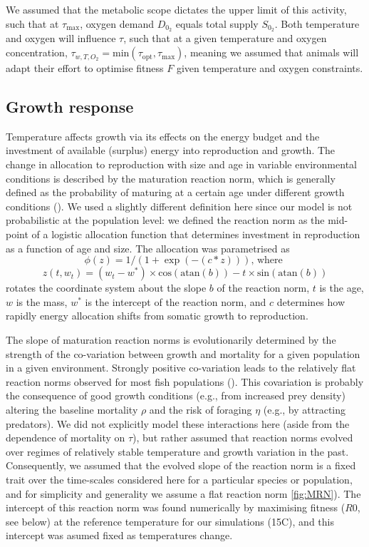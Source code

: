 \documentclass[a4paper, toc=index,abstract=true]{scrartcl}\usepackage[]{graphicx}\usepackage[]{color}
\begin{document}
\begin{spacing}{1.9}
We assumed that the metabolic scope dictates the upper limit of this activity, such that at $\tau_{\text{max}}$, oxygen demand $D_{0_2}$ equals total supply $S_{0_2}$. Both temperature and oxygen will influence $\tau$, such that at a given temperature and oxygen concentration, $\tau_{w,T,O_2} = \text{min}\left( \tau_{\text{opt}},\tau_{\text{max}} \right)$, meaning we assumed that animals will adapt their effort to optimise fitness $F$ given temperature and oxygen constraints.


\subsection{Growth response}

Temperature affects growth via its effects on the energy budget and the investment of available (surplus) energy into reproduction and growth. The change in allocation to reproduction with size and age in variable environmental conditions is described by the maturation reaction norm, which is generally defined as the probability of maturing at a certain age under different growth conditions (\cite[e.g., ][]{dieckmann_probabilistic_2007}). We used a slightly different definition here since our model is not probabilistic at the population level: we defined the reaction norm as the mid-point of a logistic allocation function that determines investment in reproduction as a function of age and size. The allocation was parametrised as 
$$\phi(z) = 1/(1+\exp(-(c*z))) \text{, where }$$
$$z(t, w_t) = (w_t-w^*)\times \text{cos}(\text{atan}(b))-t\times \text{sin}(\text{atan}(b))$$ 
rotates the coordinate system about the slope $b$ of the reaction norm, $t$ is the age, $w$ is the mass, $w^*$ is the intercept of the reaction norm, and $c$ determines how rapidly energy allocation shifts from somatic growth to reproduction.

The slope of maturation reaction norms is evolutionarily determined by the strength of the co-variation between growth and mortality for a given population in a given environment. Strongly positive co-variation leads to the relatively flat reaction norms observed for most fish populations (\cite{marty_impact_2011}). This covariation is probably the consequence of good growth conditions (e.g., from increased prey density) altering the baseline mortality $\rho$ and the risk of foraging $\eta$ (e.g., by attracting predators). We did not explicitly model these interactions here (aside from the dependence of mortality on $\tau$), but rather assumed that reaction norms evolved over regimes of relatively stable temperature and growth variation in the past. Consequently, we assumed that the evolved slope of the reaction norm is a fixed trait over the time-scales considered here for a particular species or population, and for simplicity and generality we assume a flat reaction norm \ref{fig:MRN}). The intercept of this reaction norm was found numerically by maximising fitness ($R0$, see below) at the reference temperature for our simulations (15\degree C), and this intercept was asumed fixed as temperatures change.


\end{spacing}
\end{document}
